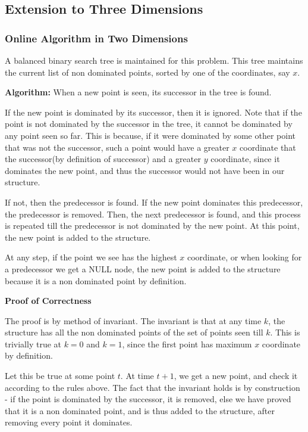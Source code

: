 \documentclass{article}
\begin{document}
\subsection{Extension to Three Dimensions}

\subsubsection{Online Algorithm in Two Dimensions}
A balanced binary search tree is maintained for this problem.
This tree maintains the current list of non dominated points, sorted by one of the coordinates, say $x$.
\par
\textbf{Algorithm:}
When a new point is seen, its successor in the tree is found.
\par
If the new point is dominated by its successor, then it is ignored.
Note that if the point is not dominated by the successor in the tree, it cannot be dominated by any point seen so far.
This is because, if it were dominated by some other point that was not the successor, such a point would have a greater $x$ coordinate that the successor(by definition of successor) and a greater $y$ coordinate, since it dominates the new point, and thus the successor would not have been in our structure.
\par
If not, then the predecessor is found.
If the new point dominates this predecessor, the predecessor is removed.
Then, the next predecessor is found, and this process is repeated till the predecessor is not dominated by the new point.
At this point, the new point is added to the structure.
\par
At any step, if the point we see has the highest $x$ coordinate, or when looking for a predecessor we get a NULL node, the new point is added to the structure because it is a non dominated point by definition.
\par
\textbf{Proof of Correctness}
\par
The proof is by method of invariant.
The invariant is that at any time $k$,  the structure has all the non dominated points of the set of points seen till $k$.
This is trivially true at $k=0$ and $k=1$, since the first point has maximum $x$ coordinate by definition.
\par
Let this be true at some point $t$.
At time $t+1$, we get a new point, and check it according to the rules above.
The fact that the invariant holds is by construction - if the point is dominated by the successor, it is removed, else we have proved that it is a non dominated point, and is thus added to the structure, after removing every point it dominates.
\end{document}
